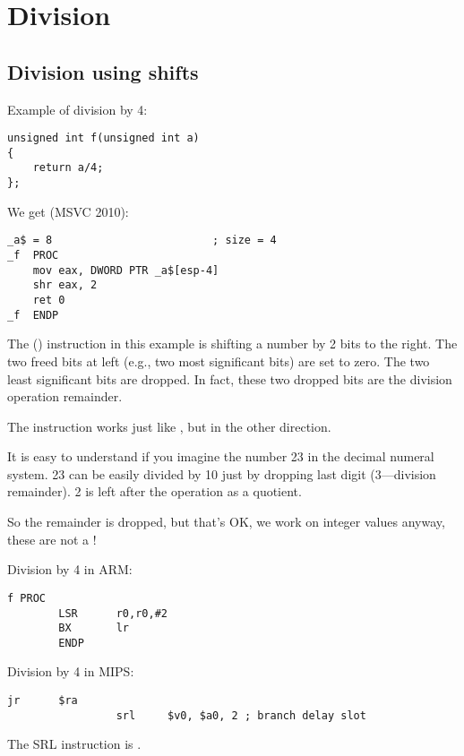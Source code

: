 \section{Division}

\subsection{Division using shifts}
\label{division_by_shifting}

Example of division by 4:

\begin{lstlisting}
unsigned int f(unsigned int a)
{
	return a/4;
};
\end{lstlisting}

We get (MSVC 2010):

\begin{lstlisting}[caption=MSVC 2010]
_a$ = 8							; size = 4
_f	PROC
	mov	eax, DWORD PTR _a$[esp-4]
	shr	eax, 2
	ret	0
_f	ENDP
\end{lstlisting}

\label{SHR}

The \SHR () instruction in this example is shifting a number by 2 bits to the right.
The two freed bits at left (e.g., two most significant bits) are set to zero.
The two least significant bits are dropped.
In fact, these two dropped bits are the division operation remainder.


The \SHR instruction works just like \SHL, but in the other direction.



It is easy to understand if you imagine the number 23 in the decimal numeral system.
23 can be easily divided by 10 just by dropping last digit (3---division remainder). 
2 is left after the operation as a \gls{quotient}.

So the remainder is dropped, but that's OK, we work on integer values anyway, 
these are not a !

Division by 4 in ARM:

\begin{lstlisting}[caption=\NonOptimizingKeilVI (\ARMMode)]
f PROC
        LSR      r0,r0,#2
        BX       lr
        ENDP
\end{lstlisting}

Division by 4 in MIPS:

\begin{lstlisting}[caption=\Optimizing GCC 4.4.5 (IDA)]
                 jr      $ra
                 srl     $v0, $a0, 2 ; branch delay slot
\end{lstlisting}

The SRL instruction is .
